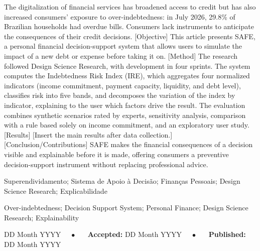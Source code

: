 \documentclass[portuguese]{sbc2025}%
\begin{document}
\begin{frontmatter}
\begin{abstract-en}
[Context] The digitalization of financial services has broadened access to credit but has also increased consumers’ exposure to over-indebtedness: in July 2026, 29.8\% of Brazilian households had overdue bills. Consumers lack instruments to anticipate the consequences of their credit decisions. [Objective] This article presents SAFE, a personal financial decision-support system that allows users to simulate the impact of a new debt or expense before taking it on. [Method] The research followed Design Science Research, with development in four sprints. The system computes the Indebtedness Risk Index (IRE), which aggregates four normalized indicators (income commitment, payment capacity, liquidity, and debt level), classifies risk into five bands, and decomposes the variation of the index by indicator, explaining to the user which factors drive the result. The evaluation combines synthetic scenarios rated by experts, sensitivity analysis, comparison with a rule based solely on income commitment, and an exploratory user study. [Results] [Insert the main results after data collection.] [Conclusion/Contributions] SAFE makes the financial consequences of a decision visible and explainable before it is made, offering consumers a preventive decision-support instrument without replacing professional advice.
\end{abstract-en}

\begin{pchaves}
Superendividamento; Sistema de Apoio à Decisão; Finanças Pessoais; Design Science Research; Explicabilidade
\end{pchaves}

\begin{keywords}
Over-indebtedness; Decision Support System; Personal Finance; Design Science Research; Explainability
\end{keywords}

\begin{dates}
 DD Month YYYY~~~$\bullet$~~~
{\sffamily\textbf{Accepted:}} DD Month YYYY~~~$\bullet$~~~
{\sffamily\textbf{Published:}} DD Month YYYY

\end{dates}



\end{frontmatter}
\end{document}
